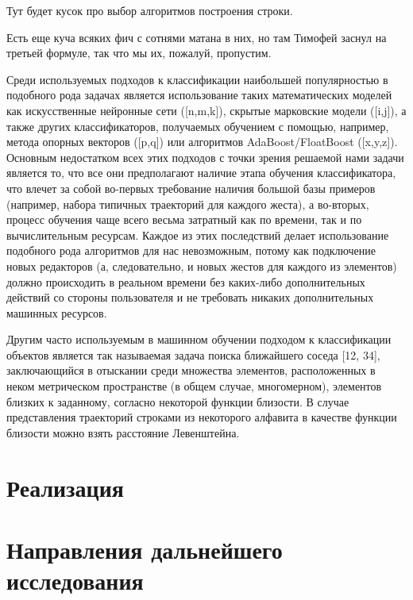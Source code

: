 \documentclass[a5paper]{article}
\begin{document}
Тут будет кусок про выбор алгоритмов построения строки.

Есть еще куча всяких фич с сотнями матана в них, но там Тимофей заснул на третьей формуле, так что мы их, пожалуй, пропустим.

Среди используемых подходов к классификации наибольшей популярностью в подобного рода задачах является использование таких математических моделей как 
искусственные нейронные сети ([n,m,k]), скрытые марковские модели ([i,j]), а также других классификаторов, получаемых обучением с помощью, например, метода
опорных векторов ([p,q]) или алгоритмов AdaBoost/FloatBoost ([x,y,z]). Основным недостатком всех этих подходов с точки зрения решаемой нами задачи является
то, что все они предполагают наличие этапа обучения классификатора, что влечет за собой во-первых требование наличия большой базы примеров (например, набора 
типичных траекторий для каждого жеста), а во-вторых, процесс обучения чаще всего весьма затратный как по времени, так и по вычислительным ресурсам. 
Каждое из этих последствий делает использование подобного рода алгоритмов для нас невозможным, потому как подключение новых редакторов (а, следовательно, и 
новых жестов для каждого из элементов) должно происходить в реальном времени без каких-либо дополнительных действий со стороны пользователя и не требовать 
никаких дополнительных машинных ресурсов. 

Другим часто используемым в машинном обучении подходом к классификации объектов является так называемая задача поиска ближайшего соседа [12, 34], заключающийся
в отыскании среди множества элементов, расположенных в неком метрическом пространстве (в общем случае, многомерном), элементов близких к заданному, согласно 
некоторой функции близости. В случае представления траекторий строками из некоторого алфавита в качестве функции близости можно взять расстояние Левенштейна.




\section{Реализация}

\section{Направления дальнейшего исследования}
\end{document}
